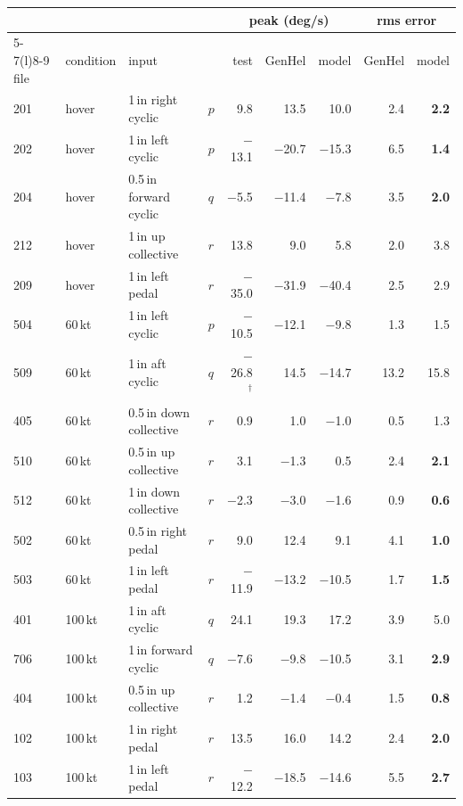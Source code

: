\begin{tabular}{@{}llllrrrrr@{}}
\toprule
 & & & & \multicolumn{3}{c}{peak (deg/s)} & \multicolumn{2}{c}{rms error} \\
\cmidrule(lr){5-7}\cmidrule(l){8-9}
file & condition & input & & test & GenHel & model & GenHel & model \\
\midrule
201 & hover & 1\,in right cyclic & $p$ & 9.8 & 13.5 & 10.0 & 2.4 & \textbf{2.2} \\
202 & hover & 1\,in left cyclic & $p$ & $-$13.1 & $-$20.7 & $-$15.3 & 6.5 & \textbf{1.4} \\
204 & hover & 0.5\,in forward cyclic & $q$ & $-$5.5 & $-$11.4 & $-$7.8 & 3.5 & \textbf{2.0} \\
212 & hover & 1\,in up collective & $r$ & 13.8 & 9.0 & 5.8 & 2.0 & 3.8 \\
209 & hover & 1\,in left pedal & $r$ & $-$35.0 & $-$31.9 & $-$40.4 & 2.5 & 2.9 \\
504 & 60\,kt & 1\,in left cyclic & $p$ & $-$10.5 & $-$12.1 & $-$9.8 & 1.3 & 1.5 \\
509 & 60\,kt & 1\,in aft cyclic & $q$ & $-$26.8$^\dagger$ & 14.5 & $-$14.7 & 13.2 & 15.8 \\
405 & 60\,kt & 0.5\,in down collective & $r$ & 0.9 & 1.0 & $-$1.0 & 0.5 & 1.3 \\
510 & 60\,kt & 0.5\,in up collective & $r$ & 3.1 & $-$1.3 & 0.5 & 2.4 & \textbf{2.1} \\
512 & 60\,kt & 1\,in down collective & $r$ & $-$2.3 & $-$3.0 & $-$1.6 & 0.9 & \textbf{0.6} \\
502 & 60\,kt & 0.5\,in right pedal & $r$ & 9.0 & 12.4 & 9.1 & 4.1 & \textbf{1.0} \\
503 & 60\,kt & 1\,in left pedal & $r$ & $-$11.9 & $-$13.2 & $-$10.5 & 1.7 & \textbf{1.5} \\
401 & 100\,kt & 1\,in aft cyclic & $q$ & 24.1 & 19.3 & 17.2 & 3.9 & 5.0 \\
706 & 100\,kt & 1\,in forward cyclic & $q$ & $-$7.6 & $-$9.8 & $-$10.5 & 3.1 & \textbf{2.9} \\
404 & 100\,kt & 0.5\,in up collective & $r$ & 1.2 & $-$1.4 & $-$0.4 & 1.5 & \textbf{0.8} \\
102 & 100\,kt & 1\,in right pedal & $r$ & 13.5 & 16.0 & 14.2 & 2.4 & \textbf{2.0} \\
103 & 100\,kt & 1\,in left pedal & $r$ & $-$12.2 & $-$18.5 & $-$14.6 & 5.5 & \textbf{2.7} \\
\bottomrule
\end{tabular}

